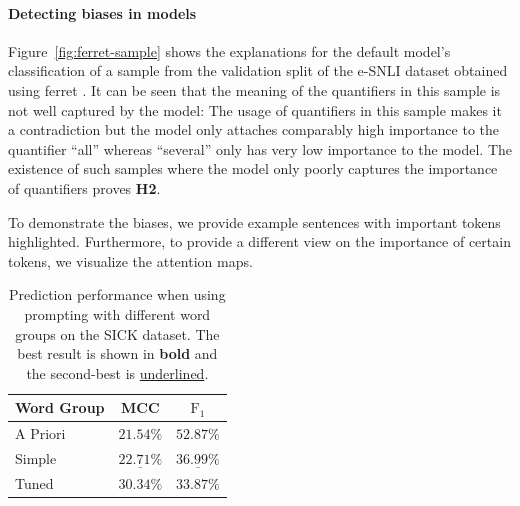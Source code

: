 \paragraph{Detecting biases in models}
Figure~\ref{fig:ferret-sample} shows the explanations for the default model's classification of a sample from the validation split of the \ac{e-SNLI} dataset obtained using ferret \cite{ferret}. It can be seen that the meaning of the quantifiers in this sample is not well captured by the model: The usage of quantifiers in this sample makes it a contradiction but the model only attaches comparably high importance to the quantifier \enquote{all} whereas \enquote{several} only has very low importance to the model. The existence of such samples where the model only poorly captures the importance of quantifiers proves \textbf{H2}.

To demonstrate the biases, we provide example sentences with important tokens highlighted. Furthermore, to provide a different view on the importance of certain tokens, we visualize the attention maps.

\begin{table}[ht!]
    \centering
    \caption{Prediction performance when using prompting with different word groups on the \acs{SICK} dataset. The best result is shown in \textbf{bold} and the second-best is \underline{underlined}.}
    \begin{tabular}{l c c}
        \toprule
        \multicolumn{1}{c}{Word Group} & \acs{MCC} & $\text{F}_1$ \\
        \midrule
        A Priori & $21.54\%$ & $\mathbf{52.87\%}$ \\
        Simple & $\underline{22.71\%}$ & $\underline{36.99\%}$ \\
        Tuned & $\mathbf{30.34\%}$ & $33.87\%$ \\
        \bottomrule
    \end{tabular}
\end{table}

